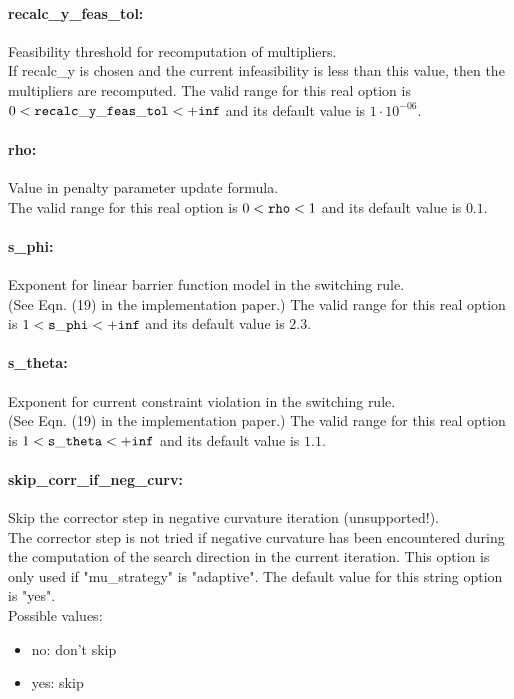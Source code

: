 \paragraph{recalc\_y\_feas\_tol:}\label{sec:recalc_y_feas_tol} Feasibility threshold for recomputation of multipliers. $\;$ \\
 If recalc\_y is chosen and the current
infeasibility is less than this value, then the
multipliers are recomputed. The valid range for this real option is 
$0 <  {\tt recalc\_y\_feas\_tol } <  {\tt +inf}$
and its default value is $1 \cdot 10^{-06}$.


\paragraph{rho:}\label{sec:rho} Value in penalty parameter update formula. $\;$ \\
 The valid range for this real option is 
$0 <  {\tt rho } <  1$
and its default value is $0.1$.


\paragraph{s\_phi:}\label{sec:s_phi} Exponent for linear barrier function model in the switching rule. $\;$ \\
 (See Eqn. (19) in the implementation paper.) The valid range for this real option is 
$1 <  {\tt s\_phi } <  {\tt +inf}$
and its default value is $2.3$.


\paragraph{s\_theta:}\label{sec:s_theta} Exponent for current constraint violation in the switching rule. $\;$ \\
 (See Eqn. (19) in the implementation paper.) The valid range for this real option is 
$1 <  {\tt s\_theta } <  {\tt +inf}$
and its default value is $1.1$.


\paragraph{skip\_corr\_if\_neg\_curv:}\label{sec:skip_corr_if_neg_curv} Skip the corrector step in negative curvature iteration (unsupported!). $\;$ \\
 The corrector step is not tried if negative
curvature has been encountered during the
computation of the search direction in the
current iteration. This option is only used if
"mu\_strategy" is "adaptive".
The default value for this string option is "yes".
\\ 
Possible values:
\begin{itemize}
   \item no: don't skip
   \item yes: skip
\end{itemize}

